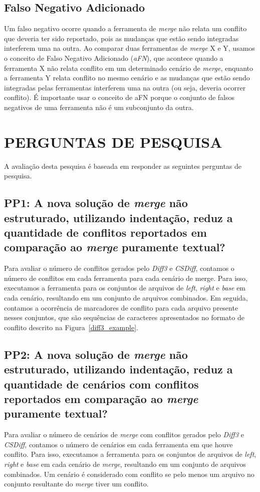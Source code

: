 \subsection{Falso Negativo Adicionado}
Um falso negativo ocorre quando a ferramenta de \emph{merge} não relata um conflito
que deveria ter sido reportado, pois as mudanças que estão sendo integradas
interferem uma na outra. Ao comparar duas ferramentas de \emph{merge} X e Y,
usamos o conceito de Falso Negativo Adicionado (\emph{aFN}), que acontece quando a ferramenta X
não relata conflito em um determinado cenário de \emph{merge}, enquanto a ferramenta Y
relata conflito no mesmo cenário e as mudanças que estão sendo integradas pelas
ferramentas interferem uma na outra (ou seja, deveria ocorrer conflito).
É importante usar o conceito de aFN porque o conjunto de falsos negativos de uma
ferramenta não é um subconjunto da outra.

\section{PERGUNTAS DE PESQUISA}
A avaliação desta pesquisa é baseada em responder as seguintes perguntas de pesquisa.
\subsection{PP1: A nova solução de \emph{merge} não estruturado, utilizando indentação,
	reduz a quantidade de conflitos reportados em comparação ao \emph{merge} puramente textual?}
Para avaliar o número de conflitos gerados pelo \emph{Diff3} e \emph{CSDiff}, contamos
o número de conflitos em cada ferramenta para cada cenário de merge. Para isso,
executamos a ferramenta para os conjuntos de arquivos de \emph{left}, \emph{right} e \emph{base} em cada cenário,
resultando em um conjunto de arquivos combinados. Em seguida, contamos a ocorrência
de marcadores de conflito para cada arquivo presente nesses conjuntos, que são sequências
de caracteres apresentados no formato de conflito descrito na Figura~\ref{diff3_example}.
\subsection{PP2: A nova solução de \emph{merge} não estruturado, utilizando indentação,
	reduz a quantidade de cenários com conflitos reportados em comparação ao \emph{merge} puramente textual?}
Para avaliar o número de cenários de \emph{merge} com conflitos gerados pelo \emph{Diff3}
e \emph{CSDiff}, contamos o número de cenários em cada ferramenta em que houve conflito.
Para isso, executamos a ferramenta para os conjuntos de arquivos de \emph{left}, \emph{right} e
\emph{base} em cada cenário de \emph{merge}, resultando em um conjunto de arquivos combinados. Um
cenário é considerado com conflito se pelo menos um arquivo no conjunto resultante do \emph{merge} tiver
um conflito.
